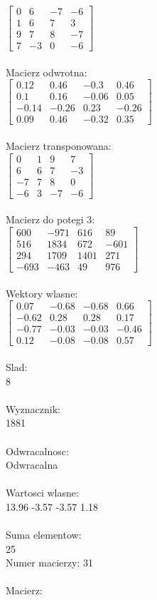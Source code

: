 \documentclass[a4paper,12pt]{article}
\begin{document}
$\begin{bmatrix} 0&6&-7&-6\\1&6&7&3\\9&7&8&-7\\7&-3&0&-6 \end{bmatrix}$
\\
\\
Macierz odwrotna:\\

$\begin{bmatrix} 0.12&0.46&-0.3&0.46\\0.1&0.16&-0.06&0.05\\-0.14&-0.26&0.23&-0.26\\0.09&0.46&-0.32&0.35 \end{bmatrix}$
\\
\\
Macierz transponowana:\\

$\begin{bmatrix} 0&1&9&7\\6&6&7&-3\\-7&7&8&0\\-6&3&-7&-6 \end{bmatrix}$
\\
\\
Macierz do potegi 3:\\

$\begin{bmatrix} 600&-971&616&89\\516&1834&672&-601\\294&1709&1401&271\\-693&-463&49&976 \end{bmatrix}$
\\
\\
Wektory wlasne:\\

$\begin{bmatrix} 0.07&-0.68&-0.68&0.66\\-0.62&0.28&0.28&0.17\\-0.77&-0.03&-0.03&-0.46\\0.12&-0.08&-0.08&0.57 \end{bmatrix}$
\\
\\
Slad:\\
8
\\
\\
Wyznacznik:\\
1881
\\
\\
Odwracalnosc:\\
Odwracalna
\\
\\
Wartosci wlasne:\\
13.96 -3.57 -3.57 1.18
\\
\\
Suma elementow:\\
25
\\
\newpage
Numer macierzy:
31
\\
\\
Macierz:\\
\end{document}
